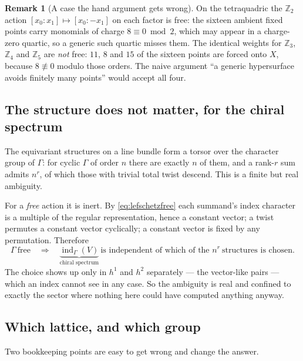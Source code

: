 \documentclass[11pt,a4paper]{article}
\theoremstyle{definition}
\newtheorem{remark}{Remark}
\begin{document}
\begin{remark}[A case the hand argument gets wrong]
On the tetraquadric the $\mathbb{Z}_2$ action $[x_0:x_1] \mapsto [x_0:-x_1]$
on each factor is free: the sixteen ambient fixed points carry monomials of
charge $8 \equiv 0 \bmod 2$, which may appear in a charge-zero quartic, so a
generic such quartic misses them. The identical weights for $\mathbb{Z}_3$,
$\mathbb{Z}_4$ and $\mathbb{Z}_5$ are \emph{not} free: $11$, $8$ and $15$ of
the sixteen points are forced onto $X$, because $8 \not\equiv 0$ modulo those
orders. The naive argument ``a generic hypersurface avoids finitely many
points'' would accept all four.
\end{remark}

\subsection{The structure does not matter, for the chiral spectrum}
\label{sec:structureirrelevant}

The equivariant structures on a line bundle form a torsor over the character
group of $\Gamma$: for cyclic $\Gamma$ of order $n$ there are exactly $n$ of
them, and a rank-$r$ sum admits $n^r$, of which those with trivial total twist
descend. This is a finite but real ambiguity.

For a \emph{free} action it is inert. By \cref{eq:lefschetzfree} each summand's
index character is a multiple of the regular representation, hence a constant
vector; a twist permutes a constant vector cyclically; a constant vector is
fixed by any permutation. Therefore
%
\begin{equation}
\Gamma \ \text{free}
\quad\Longrightarrow\quad
\underbrace{\operatorname{ind}_\Gamma(V)}_{\text{chiral spectrum}}
\ \text{is independent of which of the } n^r \ \text{structures is chosen.}
\label{eq:structureirrelevant}
\end{equation}
%
The choice shows up only in $h^1$ and $h^2$ separately --- the vector-like
pairs --- which an index cannot see in any case. So the ambiguity is real and
confined to exactly the sector where nothing here could have computed anything
anyway.

\subsection{Which lattice, and which group}

Two bookkeeping points are easy to get wrong and change the answer.
\end{document}
